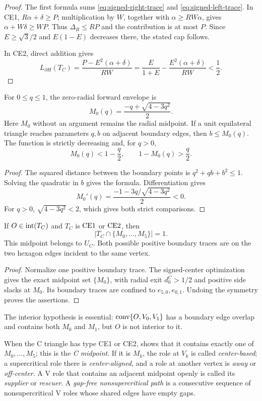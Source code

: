 \begin{proof}
The first formula sums \eqref{eq:signed-right-trace} and
\eqref{eq:signed-left-trace}.  In CE1,
$R\alpha+\delta\ge P$; multiplication by $W$, together with
$\alpha\ge RW\alpha$, gives $\alpha+W\delta\ge WP$.  Thus
$\Delta_R\le RP$ and the contribution is at most $P$.  Since
$E\ge\sqrt3/2$ and $E(1-E)$ decreases there, the stated cap follows.

In CE2, direct addition gives
\[
 L_{\partial H}(T_C)
 =\frac{P-E^2(\alpha+\delta)}{RW}
 =\frac{E}{1+E}-\frac{E^2(\alpha+\delta)}{RW}<\frac12.
\]
\end{proof}

\begin{lemma}
\label{lem:signed-diameter-transfer}
For $0\le q\le1$, the zero-radial forward envelope is
\[
 M_0(q)=\frac{-q+\sqrt{4-3q^2}}2.
\]
Here $M_0$ without an argument remains the radial midpoint.  If a unit
equilateral triangle reaches parameters $q,b$ on adjacent boundary edges,
then $b\le M_0(q)$.  The function is strictly decreasing and, for $q>0$,
\[
 M_0(q)<1-\frac q2,
 \qquad 1-M_0(q)>\frac q2.
\]
\end{lemma}

\begin{proof}
The squared distance between the boundary points is $q^2+qb+b^2\le1$.
Solving the quadratic in $b$ gives the formula.  Differentiation gives
\[
 M_0'(q)=\frac{-1-3q/\sqrt{4-3q^2}}2<0.
\]
For $q>0$, $\sqrt{4-3q^2}<2$, which gives both strict comparisons.
\end{proof}

\begin{proposition}
\label{prop:unique-center-midpoint}
If $O\in\mathrm{int}(T_C)$ and $T_C$ is $\mathrm{CE1}$ or $\mathrm{CE2}$, then
\[
 \left|T_C\cap\{M_0,\ldots,M_5\}\right|=1.
\]
This midpoint belongs to $U_C$. Both possible positive boundary traces
are on the two hexagon edges incident to the same vertex.
\end{proposition}

\begin{proof}
Normalize one positive boundary trace.  The signed-center optimization
 gives the exact midpoint set
$\{M_0\}$, with radial exit $d_0^C>1/2$ and positive side slacks at
$M_0$. Its boundary traces are confined to $e_{5,0},e_{0,1}$.
Undoing the symmetry proves the assertions.
\end{proof}

The interior hypothesis is essential: $\mathrm{conv}\{O,V_0,V_1\}$ has a boundary
edge overlap and contains both $M_0$ and $M_1$, but $O$ is not interior to it.

When the C triangle has type CE1 or CE2, 
shows that it contains exactly one of $M_0,\ldots,M_5$; this is the
\emph{C midpoint}. If it is $M_k$, the role at $V_k$ is called
\emph{center-based}; a supercritical role there is \emph{center-aligned},
and a role at another vertex is \emph{away} or \emph{off-center}.
A V role that contains an adjacent midpoint openly is
called its \emph{supplier} or \emph{rescuer}. A \emph{gap-free
nonsupercritical path} is a consecutive sequence of nonsupercritical V
roles whose shared edges have empty gaps.

